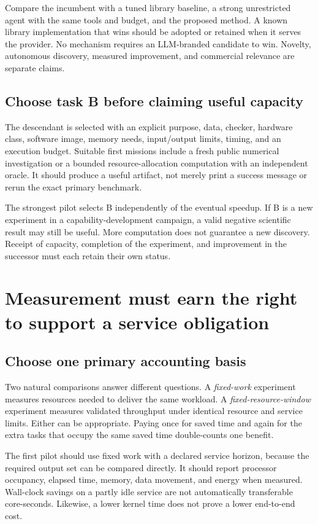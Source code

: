 \documentclass[11pt,letterpaper]{article}
\theoremstyle{remark}\newtheorem{remark}{Remark}[section]
\begin{document}
Compare the incumbent with a tuned library baseline, a strong unrestricted agent with the same tools and budget, and the proposed method. A known library implementation that wins should be adopted or retained when it serves the provider. No mechanism requires an LLM-branded candidate to win. Novelty, autonomous discovery, measured improvement, and commercial relevance are separate claims.

\subsection{Choose task B before claiming useful capacity}
The descendant is selected with an explicit purpose, data, checker, hardware class, software image, memory needs, input/output limits, timing, and an execution budget. Suitable first missions include a fresh public numerical investigation or a bounded resource-allocation computation with an independent oracle. It should produce a useful artifact, not merely print a success message or rerun the exact primary benchmark.

The strongest pilot selects B independently of the eventual speedup. If B is a new experiment in a capability-development campaign, a valid negative scientific result may still be useful. More computation does not guarantee a new discovery. Receipt of capacity, completion of the experiment, and improvement in the successor must each retain their own status.

\section{Measurement must earn the right to support a service obligation}
\label{sec:measurement}
\subsection{Choose one primary accounting basis}
Two natural comparisons answer different questions. A \emph{fixed-work} experiment measures resources needed to deliver the same workload. A \emph{fixed-resource-window} experiment measures validated throughput under identical resource and service limits. Either can be appropriate. Paying once for saved time and again for the extra tasks that occupy the same saved time double-counts one benefit.

The first pilot should use fixed work with a declared service horizon, because the required output set can be compared directly. It should report processor occupancy, elapsed time, memory, data movement, and energy when measured. Wall-clock savings on a partly idle service are not automatically transferable core-seconds. Likewise, a lower kernel time does not prove a lower end-to-end cost.
\end{document}
